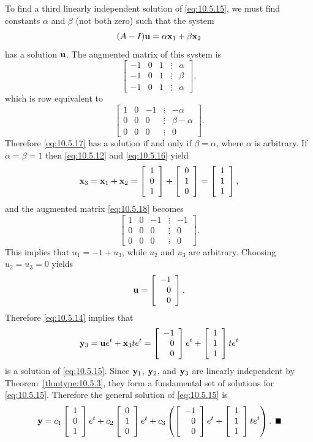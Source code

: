 \begin{examplesolution}
To find a third linearly independent solution of \eqref{eq:10.5.15}, we must find constants $\alpha$
and $\beta$ (not both zero) such that the system
\begin{equation}
  \label{eq:10.5.17}(A-I){\bf u}=\alpha{\bf x}_{1}+\beta{\bf x}_{2}
\end{equation}
has a solution ${\bf u}$. The augmented matrix of this system is
\[
  \left[
  \begin{array}{rrrcr}
    -1 & 0 & 1 & \vdots & \alpha \\
    -1 & 0 & 1 & \vdots & \beta  \\
    -1 & 0 & 1 & \vdots & \alpha
  \end{array}\right],
\]
which is row equivalent to
\begin{equation}
  \label{eq:10.5.18}\left[
  \begin{array}{rrrcr}
    1 & 0 & -1 & \vdots & -\alpha      \\
    0 & 0 & 0  & \vdots & \beta-\alpha \\
    0 & 0 & 0  & \vdots & 0
  \end{array}
  \right].
\end{equation}
Therefore \eqref{eq:10.5.17} has a solution if and only if $\beta=\alpha$, where $\alpha$ is
arbitrary. If $\alpha=\beta=1$ then \eqref{eq:10.5.12} and \eqref{eq:10.5.16} yield
\[
  {\bf x}_{3}={\bf x}_{1}+{\bf x}_{2}= \left[\begin{array}{r}1\\0\\1\end{array}\right]+\left[\begin{array}{r}0\\1\\0\end{array}\right]=\left[\begin{array}{r}1\\1\\1\end{array}\right],
\]
and the augmented matrix \eqref{eq:10.5.18} becomes
\[
  \left[
  \begin{array}{rrrcr}
    1 & 0 & -1 & \vdots & -1 \\
    0 & 0 & 0  & \vdots & 0  \\
    0 & 0 & 0  & \vdots & 0
  \end{array}
  \right].
\]
This implies that $u_{1}=-1+u_{3}$, while $u_{2}$ and $u_{3}$ are arbitrary. Choosing
$u_{2}=u_{3}=0$ yields
\[
  {\bf u}=\left[\begin{array}{r}-1\\0\\0\end{array}\right].
\]
Therefore \eqref{eq:10.5.14} implies that
\[
  {\bf y}_{3}={\bf u}e^{t}+{\bf x}_{3}te^{t}=\left[\begin{array}{r}-1\\0\\0\end{array}\right]e^{t}+\left[\begin{array}{r}1\\1\\1\end{array}\right]te^{t}
\]
is a solution of \eqref{eq:10.5.15}. Since ${\bf y}_{1}$, ${\bf y}_{2}$, and ${\bf y}_{3}$ are
linearly independent by Theorem~\ref{thmtype:10.5.3}, they form a fundamental set of solutions for
\eqref{eq:10.5.15}. Therefore the general solution of \eqref{eq:10.5.15} is
\[
  {\bf y}=c_{1}\threecol101e^{t}+c_{2}\threecol010e^{t}+c_{3}\left(\threecol{-1}00e^{t}+\threecol111te^{t}\right).\bbox
\]
\end{examplesolution}

